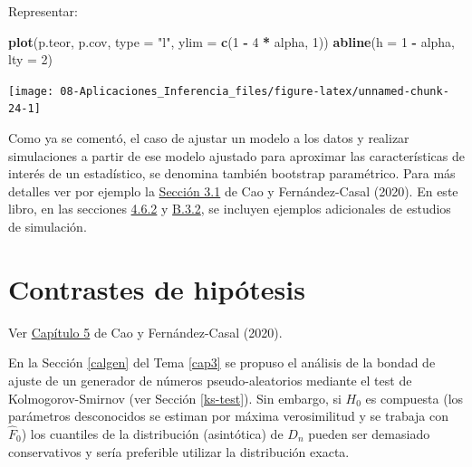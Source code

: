 \documentclass[
]{book}
\newenvironment{Shaded}{\begin{snugshade}}{\end{snugshade}}
\newcommand{\DataTypeTok}[1]{\textcolor[rgb]{0.13,0.29,0.53}{#1}}
\newcommand{\DecValTok}[1]{\textcolor[rgb]{0.00,0.00,0.81}{#1}}
\newcommand{\KeywordTok}[1]{\textcolor[rgb]{0.13,0.29,0.53}{\textbf{#1}}}
\newcommand{\NormalTok}[1]{#1}
\newcommand{\OperatorTok}[1]{\textcolor[rgb]{0.81,0.36,0.00}{\textbf{#1}}}
\newcommand{\StringTok}[1]{\textcolor[rgb]{0.31,0.60,0.02}{#1}}
\theoremstyle{break}
\theoremstyle{definition}
\theoremstyle{definition}
\theoremstyle{definition}
\theoremstyle{remark}
\let\BeginKnitrBlock\begin \let\EndKnitrBlock\end
\begin{document}
\begin{enumerate}
  Representar:

\begin{Shaded}
\begin{Highlighting}[]
\KeywordTok{plot}\NormalTok{(p.teor, p.cov, }\DataTypeTok{type =} \StringTok{"l"}\NormalTok{, }\DataTypeTok{ylim =} \KeywordTok{c}\NormalTok{(}\DecValTok{1} \OperatorTok{-}\StringTok{ }\DecValTok{4} \OperatorTok{*}\StringTok{ }\NormalTok{alpha, }\DecValTok{1}\NormalTok{))}
\KeywordTok{abline}\NormalTok{(}\DataTypeTok{h =} \DecValTok{1} \OperatorTok{-}\StringTok{ }\NormalTok{alpha, }\DataTypeTok{lty =} \DecValTok{2}\NormalTok{) }
\end{Highlighting}
\end{Shaded}

  \begin{center}\texttt{[image: 08-Aplicaciones\_Inferencia\_files/figure-latex/unnamed-chunk-24-1]} \end{center}
\end{enumerate}

Como ya se comentó, el caso de ajustar un modelo a los datos y realizar simulaciones a partir de ese modelo ajustado para aproximar las características de interés de un estadístico, se denomina también bootstrap paramétrico.
Para más detalles ver por ejemplo la \href{https://rubenfcasal.github.io/book_remuestreo/modunif-boot-par.html}{Sección 3.1} de Cao y Fernández-Casal (2020).
En este libro, en las secciones \href{https://rubenfcasal.github.io/book_remuestreo/icboot-ejem.html\#estudio-sim-exp}{4.6.2} y \href{https://rubenfcasal.github.io/book_remuestreo/ejemplos-3.html\#estudio-sim-boot}{B.3.2}, se incluyen ejemplos adicionales de estudios de simulación.

\hypertarget{contrastes}{%
\section{Contrastes de hipótesis}\label{contrastes}}

Ver \href{https://rubenfcasal.github.io/book_remuestreo/contrastes.html}{Capítulo 5} de Cao y Fernández-Casal (2020).

\BeginKnitrBlock{exercise}[Test de Kolmogorov-Smirnov]
\protect\hypertarget{exr:ks-test-sim}{}{\label{exr:ks-test-sim} {} }
\EndKnitrBlock{exercise}

En la Sección \ref{calgen} del Tema \ref{cap3} se propuso el análisis de la bondad de ajuste de un generador de números pseudo-aleatorios mediante el test de Kolmogorov-Smirnov (ver Sección \ref{ks-test}).
Sin embargo, si \(H_{0}\) es compuesta (los parámetros desconocidos se estiman por máxima verosimilitud y se trabaja con \(\hat{F}_{0}\)) los cuantiles de la distribución (asintótica) de \(D_{n}\) pueden ser demasiado conservativos y sería preferible utilizar la distribución exacta.
\end{document}
